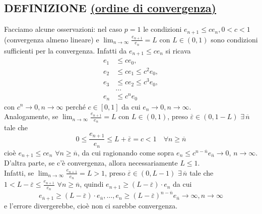 \documentclass[12pt]{article}
\begin{document}
\subsection{DEFINIZIONE \uline{(ordine di convergenza)}}
\begin{center}
\end{center}
Facciamo alcune osservazioni: nel caso $p=1$ le condizioni $e_{n+1} \leq ce_n, 0<c<1$  (convergenza almeno lineare) e $\lim_{n\to\infty}{\frac{e_{n+1}}{e_n}}=L$ con $L\in(0,1)$ sono condizioni sufficienti per la convergenza. Infatti da $e_{n+1}\leq ce_n$ si ricava 
\[\begin{split}
    e_1 & \leq ce_0, \\
    e_2 & \leq ce_1 \leq c^2e_0, \\
    e_3 & \leq ce_2 \leq c^3e_0, \\
    & \dotso \\
    e_n & \leq c^ne_0
\end{split}\] 
con $c^n\rightarrow 0,n\rightarrow\infty$ perché $c\in[0,1]$ da cui $e_n\rightarrow 0, n\rightarrow\infty$. \\
Analogamente, se $\lim_{n\to \infty}{\frac{e_{n+1}}{e_n}}=L$ con $L\in(0,1)$, preso $\overline{\varepsilon}\in(0,1-L)$ $\exists\, \overline{n}$ tale che 
\[0\leq\frac{e_{n+1}}{e_n}\leq L+\overline{\varepsilon}=c<1 \quad\forall n \geq \overline{n}\] 
cioè $e_{n+1}\leq ce_n$ $\forall n\geq\overline{n}$, da cui ragionando come sopra $e_n \leq c^{n-\overline{n}}e_{\overline{n}} \rightarrow 0$, $n\rightarrow\infty$.\\
D'altra parte, se c'è convergenza, allora necessariamente $L\le 1$.\\
Infatti, se $\lim_{n \to \infty} \frac{e_{n+1}}{e_n} = L > 1$, preso $\overline{\varepsilon} \in (0, L-1)$ $ \exists\, \overline{n}$ tale che $1<L-\overline{\varepsilon} \leq \frac{e_{n+1}}{e_n}$ $\forall n \geq \overline{n}$, quindi $e_{n+1} \geq (L-\overline{\varepsilon})\cdot e_n$ da cui 
\[e_{\overline{n}+1} \geq (L-\overline{\varepsilon}) \cdot e_{\overline{n}}, \dotso, e_n \geq (L-\overline{\varepsilon})^{n-\overline{n}} e_{\overline{n}} \to \infty, n \to \infty\]
e l'errore divergerebbe, cioè non ci sarebbe convergenza.
\end{document}
